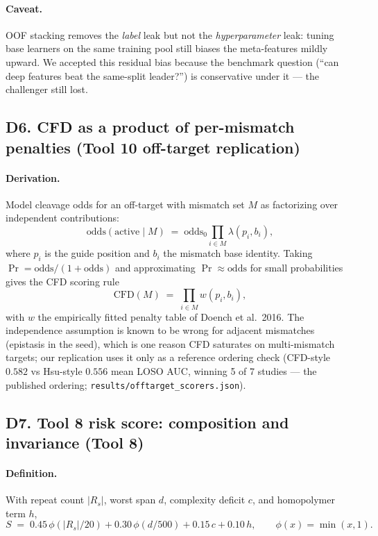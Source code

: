 \paragraph{Caveat.} OOF stacking removes the \emph{label} leak but not the
\emph{hyperparameter} leak: tuning base learners on the same training pool
still biases the meta-features mildly upward. We accepted this residual
bias because the benchmark question (``can deep features beat the
same-split leader?'') is conservative under it --- the challenger still
lost.

\subsection{D6. CFD as a product of per-mismatch penalties (Tool 10 off-target replication)}
\paragraph{Derivation.} Model cleavage odds for an off-target with
mismatch set $M$ as factorizing over independent contributions:
\begin{equation}
\text{odds}(\text{active} \mid M) \;=\; \text{odds}_0 \prod_{i \in M} \lambda(p_i, b_i),
\end{equation}
where $p_i$ is the guide position and $b_i$ the mismatch base identity.
Taking $\Pr = \text{odds}/(1+\text{odds})$ and approximating
$\Pr \approx \text{odds}$ for small probabilities gives the CFD scoring
rule
\begin{equation}
\text{CFD}(M) \;=\; \prod_{i \in M} w(p_i, b_i),
\end{equation}
with $w$ the empirically fitted penalty table of Doench et al.\ 2016. The
independence assumption is known to be wrong for adjacent mismatches
(epistasis in the seed), which is one reason CFD saturates on
multi-mismatch targets; our replication uses it only as a reference
ordering check (CFD-style $0.582$ vs Hsu-style $0.556$ mean LOSO AUC,
winning 5 of 7 studies --- the published ordering;
\texttt{results/offtarget\_scorers.json}).

\subsection{D7. Tool 8 risk score: composition and invariance (Tool 8)}
\paragraph{Definition.} With repeat count $|R_s|$, worst span $d$,
complexity deficit $c$, and homopolymer term $h$,
\begin{equation}
S \;=\; 0.45\, \phi(|R_s|/20) + 0.30\, \phi(d/500) + 0.15\, c + 0.10\, h,
\qquad \phi(x) = \min(x, 1).
\label{eq:tool8}
\end{equation}
